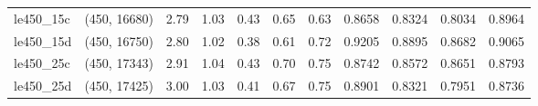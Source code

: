 \begin{tabular}{llrrrrrrrrr}
 le450\_15c & (450, 16680) &  2.79 & 1.03 & 0.43 &  0.65 &   0.63 &   0.8658 &   0.8324 &     0.8034 &      0.8964 \\
 le450\_15d & (450, 16750) &  2.80 & 1.02 & 0.38 &  0.61 &   0.72 &   0.9205 &   0.8895 &     0.8682 &      0.9065 \\
 le450\_25c & (450, 17343) &  2.91 & 1.04 & 0.43 &  0.70 &   0.75 &   0.8742 &   0.8572 &     0.8651 &      0.8793 \\
 le450\_25d & (450, 17425) &  3.00 & 1.03 & 0.41 &  0.67 &   0.75 &   0.8901 &   0.8321 &     0.7951 &      0.8736 \\
\bottomrule
\end{tabular}

